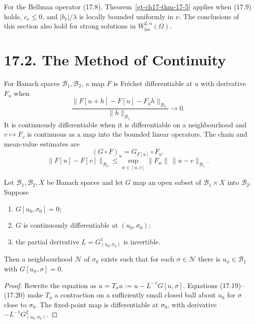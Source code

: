 For the Bellman operator (17.8), Theorem~\ref{gt-ch17-thm-17-5} applies when (17.9) holds,
$c_\nu\le0$, and $|b_\nu|/\lambda$ is locally bounded uniformly in $\nu$.
The conclusions of this section also hold for strong solutions in
$W^{2,n}_{\mathrm{loc}}(\Omega)$.

\section*{17.2. The Method of Continuity}

For Banach spaces $\mathcal B_1,\mathcal B_2$, a map $F$ is Fr\'echet
differentiable at $u$ with derivative $F_u$ when
\begin{equation}\tag{17.18}
\frac{\|F[u+h]-F[u]-F_uh\|_{\mathcal B_2}}{\|h\|_{\mathcal B_1}}
\longrightarrow0.
\end{equation}
It is continuously differentiable when it is differentiable on a neighbourhood
and $v\mapsto F_v$ is continuous as a map into the bounded linear operators.
The chain and mean-value estimates are
\begin{equation}
(G\circ F)_u=G_{F[u]}\circ F_u.
\tag{17.19}
\end{equation}
\begin{equation}
\|F[u]-F[v]\|_{\mathcal B_2}
\le \sup_{w\in[u,v]}\|F_w\|\,\|u-v\|_{\mathcal B_1}.
\tag{17.20}
\end{equation}

\begin{theorem}\label{gt-ch17-thm-17-6}
Let $\mathcal B_1,\mathcal B_2,X$ be Banach spaces and let $G$ map an open
subset of $\mathcal B_1\times X$ into $\mathcal B_2$.  Suppose
\begin{enumerate}
\item[(i)] $G[u_0,\sigma_0]=0$;
\item[(ii)] $G$ is continuously differentiable at $(u_0,\sigma_0)$;
\item[(iii)] the partial derivative $L=G^1_{(u_0,\sigma_0)}$ is invertible.
\end{enumerate}
Then a neighbourhood $\mathcal N$ of $\sigma_0$ exists such that for each
$\sigma\in\mathcal N$ there is $u_\sigma\in\mathcal B_1$ with
$G[u_\sigma,\sigma]=0$.
\end{theorem}
\begin{proof}
\sketch Rewrite the equation as
$u=T_\sigma u:=u-L^{-1}G[u,\sigma]$.  Equations (17.19)--(17.20) make
$T_\sigma$ a contraction on a sufficiently small closed ball about $u_0$ for
$\sigma$ close to $\sigma_0$.  The fixed-point map is differentiable at
$\sigma_0$, with derivative $-L^{-1}G^2_{(u_0,\sigma_0)}$.
\end{proof}

